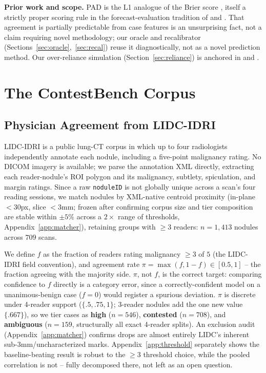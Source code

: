 \documentclass[letterpaper]{article} %
\begin{document}
\textbf{Prior work and scope.} PAD is the L1 analogue of the Brier score
\citep{brier1950verification}, itself a strictly proper scoring rule
\citep{gneiting2007strictly} in the forecast-evaluation tradition of
\citet{murphy1973vector} and \citet{degroot1983comparison}. That agreement
is partially predictable from case features is an unsurprising fact, not a
claim requiring novel methodology; our oracle and recalibrator
(Sections~\ref{sec:oracle},~\ref{sec:recal}) reuse it diagnostically, not
as a novel prediction method. Our over-reliance
simulation (Section~\ref{sec:reliance}) is anchored in \citet{lee2004trust}
and \citet{parasuraman1997humans}.

\section{The ContestBench Corpus}
\label{sec:corpus}

\subsection{Physician Agreement from LIDC-IDRI}
LIDC-IDRI \citep{armato2011lidc} is a public lung-CT corpus in which up to
four radiologists independently annotate each nodule, including a five-point
malignancy rating. No DICOM imagery is available; we parse the annotation
XML directly, extracting each reader-nodule's ROI polygon and its
malignancy, subtlety, spiculation, and margin ratings. Since a raw
\texttt{noduleID} is not globally unique across a scan's four reading
sessions, we match nodules by XML-native centroid proximity (in-plane
$<30$px, slice $<3$mm; frozen after confirming corpus size and tier
composition are stable within $\pm5\%$ across a $2\times$ range of
thresholds, Appendix~\ref{app:matcher}), retaining groups with $\geq3$
readers: $n{=}1{,}413$ nodules across $709$ scans.

We define $f$ as the fraction of readers rating malignancy $\geq3$ of $5$
(the LIDC-IDRI field convention), and agreement rate $\pi = \max(f,1-f) \in
[0.5,1]$ -- the fraction agreeing with the majority side. $\pi$, not $f$, is
the correct target: comparing confidence to $f$ directly is a category
error, since a correctly-confident model on a unanimous-benign case ($f{=}0$)
would register a spurious deviation. $\pi$ is discrete under 4-reader support
($\{.5,.75,1\}$; 3-reader nodules add the one new value $\{.667\}$), so we tier cases as
\textbf{high} ($n{=}546$), \textbf{contested} ($n{=}708$), and
\textbf{ambiguous} ($n{=}159$, structurally all exact 4-reader splits). An
exclusion audit (Appendix~\ref{app:matcher}) confirms drops are almost
entirely LIDC's inherent sub-3mm/uncharacterized marks. Appendix~\ref{app:threshold}
separately shows the baseline-beating result is robust to the $\geq3$
threshold choice, while the pooled correlation is not -- fully decomposed
there, not left as an open question.
\end{document}
